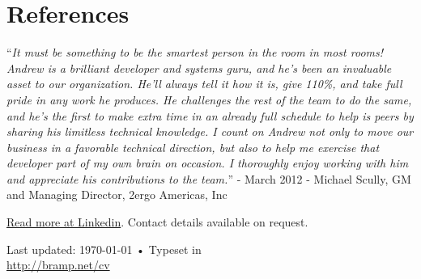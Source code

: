 \documentclass[letterpaper,10pt]{article}
\begin{document}
\section{References}
``{\it It must be something to be the smartest person in the room in most rooms! Andrew is a brilliant developer and systems guru, and he's been 
an invaluable asset to our organization. He'll always tell it how it is, give 110\%, and take full pride in any work he produces. He challenges the rest of the 
team to do the same, and he's the first to make extra time in an already full schedule to help is peers by sharing his limitless technical knowledge. I count on 
Andrew not only to move our business in a favorable technical direction, but also to help me exercise that developer part of my own brain on occasion. I 
thoroughly enjoy working with him and appreciate his contributions to the team.}'' - March 2012 - Michael Scully, GM and Managing Director, 2ergo Americas, Inc

\href{http://www.linkedin.com/in/bramp}{Read more at Linkedin}. Contact details available on request.



\newpage
\renewcommand\refname{Publications}


\vfill{}

\begin{center}
{\scriptsize  Last updated: \today\- •\- 
Typeset in \XeLaTeX\\
\href{http://bramp.net/cv}{http://bramp.net/cv}}
\end{center}
\end{document}

